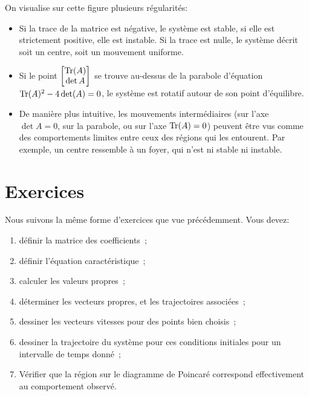             On visualise sur cette figure plusieurs régularités:
            \begin{itemize}
                \item Si la trace de la matrice est négative, le système est stable, si elle est strictement positive, elle est instable. Si la trace est nulle, le système décrit soit un centre, soit un mouvement uniforme.
                \item Si le point $\begin{bmatrix}\operatorname{Tr}(A)\\\det A\end{bmatrix}$ se trouve au-dessus de la parabole d'équation $\operatorname{Tr}(A)^2 - 4 \det(A) = 0$, le système est rotatif autour de son point d'équilibre.
                \item De manière plus intuitive, les mouvements intermédiaires (sur l'axe $\det A = 0$,  sur la parabole, ou sur l'axe $\operatorname{Tr}(A) = 0$) peuvent être vus comme des comportements limites entre ceux des régions qui les entourent. Par exemple, un centre ressemble à un foyer, qui n'est ni stable ni instable.
            \end{itemize}
            
    \section{Exercices}
        Nous suivons la même forme d'exercices que vue précédemment.
        Vous devez:
        \begin{enumerate}
            \item définir la matrice des coefficients~;
            \item définir l'équation caractéristique~;
            \item calculer les valeurs propres~;
            \item déterminer les vecteurs propres, et les trajectoires associées~;
            \item dessiner les vecteurs vitesses pour des points bien choisis~;
            \item dessiner la trajectoire du système pour ces conditions initiales pour un intervalle de temps donné~;
            \item Vérifier que la région sur le diagramme de Poincaré correspond effectivement au comportement observé.
        \end{enumerate}
        
